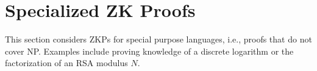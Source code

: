 \section{Specialized ZK Proofs}
\label{paradigms:specialized}

This section considers ZKPs for special purpose languages, i.e., proofs that do not cover NP.
Examples include proving knowledge of a discrete logarithm or the factorization of an RSA modulus $N$.
\loosen

\WANTED[]

